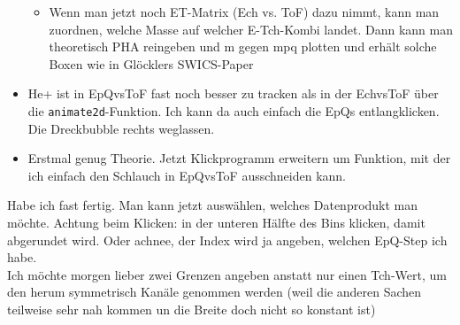 \documentclass[11pt,letterpaper]{article}
\begin{document}
\begin{itemize}
\begin{itemize}
		\item Wenn man jetzt noch ET-Matrix (Ech vs. ToF) dazu nimmt, kann man zuordnen, welche Masse auf welcher E-Tch-Kombi landet. Dann kann man theoretisch PHA reingeben und m gegen mpq plotten und erhält solche Boxen wie in Glöcklers SWICS-Paper 
	\end{itemize}
	\item He+ ist in EpQvsToF fast noch besser zu tracken als in der EchvsToF über die \verb|animate2d|-Funktion. Ich kann da auch einfach die EpQs entlangklicken. Die Dreckbubble rechts weglassen.
	\item Erstmal genug Theorie. Jetzt Klickprogramm erweitern um Funktion, mit der ich einfach den Schlauch in EpQvsToF ausschneiden kann.
\end{itemize}
%
Habe ich fast fertig. Man kann jetzt auswählen, welches Datenprodukt man möchte. Achtung beim Klicken: in der unteren Hälfte des Bins klicken, damit abgerundet wird. Oder achnee, der Index wird ja angeben, welchen EpQ-Step ich habe. \\
Ich möchte morgen lieber zwei Grenzen angeben anstatt nur einen Tch-Wert, um den herum symmetrisch Kanäle genommen werden (weil die anderen Sachen teilweise sehr nah kommen un die Breite doch nicht so konstant ist)
\end{document}
